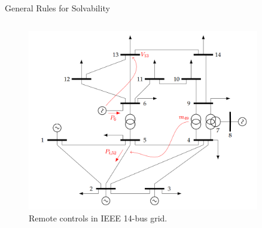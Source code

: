 \begin{frame}{General Rules for Solvability}
\begin{columns}
        \begin{column}{0.5\textwidth}
            \begin{figure}[H]
                \centering
                \includegraphics[width=0.9\textwidth]{chapter5pics/remote.png}
                \caption{Remote controls in IEEE 14-bus grid.}
                \label{fig:simple6bus}
            \end{figure}
        \end{column}
    \end{columns}
\end{frame}






